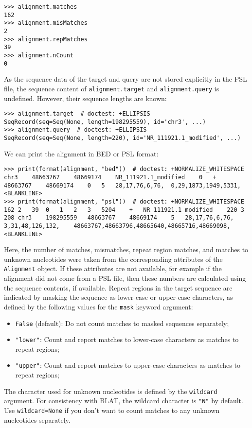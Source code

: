 \begin{verbatim}
>>> alignment.matches
162
>>> alignment.misMatches
2
>>> alignment.repMatches
39
>>> alignment.nCount
0
\end{verbatim}
As the sequence data of the target and query are not stored explicitly in the PSL file, the sequence content of \verb|alignment.target| and \verb|alignment.query| is undefined. However, their sequence lengths are known:
\begin{verbatim}
>>> alignment.target  # doctest: +ELLIPSIS
SeqRecord(seq=Seq(None, length=198295559), id='chr3', ...)
>>> alignment.query  # doctest: +ELLIPSIS
SeqRecord(seq=Seq(None, length=220), id='NR_111921.1_modified', ...)
\end{verbatim}
We can print the alignment in BED or PSL format:
\begin{verbatim}
>>> print(format(alignment, "bed"))  # doctest: +NORMALIZE_WHITESPACE
chr3	48663767	48669174	NR_111921.1_modified	0	+	48663767	48669174	0	5	28,17,76,6,76,	0,29,1873,1949,5331,
<BLANKLINE>
>>> print(format(alignment, "psl"))  # doctest: +NORMALIZE_WHITESPACE
162	2	39	0	1	2	3	5204	+	NR_111921.1_modified	220	3	208	chr3	198295559	48663767	48669174	5	28,17,76,6,76,	3,31,48,126,132,	48663767,48663796,48665640,48665716,48669098,
<BLANKLINE>
\end{verbatim}
Here, the number of matches, mismatches, repeat region matches, and matches to unknown nucleotides were taken from the corresponding attributes of the \verb|Alignment| object. If these attributes are not available, for example if the alignment did not come from a PSL file, then these numbers are calculated using the sequence contents, if available.
Repeat regions in the target sequence are indicated by masking the sequence as lower-case or upper-case characters, as defined by the following values for the \verb+mask+ keyword argument:
\begin{itemize}
\item \verb+False+ (default): Do not count matches to masked sequences separately;
\item \verb+"lower"+: Count and report matches to lower-case characters as matches to repeat regions;
\item \verb+"upper"+: Count and report matches to upper-case characters as matches to repeat regions;
\end{itemize}
The character used for unknown nucleotides is defined by the \verb+wildcard+ argument. For consistency with BLAT, the wildcard character is \verb+"N"+ by default. Use \verb+wildcard=None+ if you don't want to count matches to any unknown nucleotides separately.
